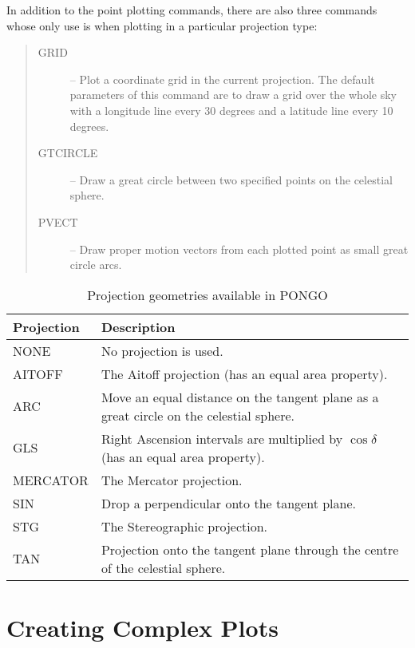 \documentclass[twoside,11pt]{article}
\newcommand{\htmlref}[2]{#1}
\renewcommand{\_}{\texttt{\symbol{95}}}
\newcommand{\iref} [1]{\htmlref{#1}{#1}}
\begin{document}
In addition to the point plotting commands, there are also three commands whose
only use is when plotting in a particular projection type:

\begin {quote}
\begin{description}
\item [\iref{GRID}] -- Plot a coordinate grid in the current projection.
                       The default parameters of this command are to draw a
                       grid over the whole sky with a longitude line every 30
                       degrees and a latitude line every 10 degrees.
\item [\iref{GT\_CIRCLE}] -- Draw a great circle between two specified points
                             on the celestial sphere.
\item [\iref{PVECT}] -- Draw proper motion vectors from each plotted point as
                        small great circle arcs.
\end{description}
\end {quote}

\begin{table}[t]
\centering
\begin{tabular}{|l|p{}|}
\hline 
Projection & Description \\
\hline
NONE     & No projection is used. \\
AITOFF   & The Aitoff projection (has an equal area property). \\
ARC      & Move an equal distance on the tangent plane as a great circle on the
celestial sphere. \\
GLS      & Right Ascension intervals are multiplied by $\cos\delta$ (has an
equal area property). \\
MERCATOR & The Mercator projection. \\
SIN      & Drop a perpendicular onto the tangent plane. \\
STG      & The Stereographic projection. \\
TAN      & Projection onto the tangent plane through the centre of the
celestial sphere. \\
\hline
\end{tabular}
\caption{Projection geometries available in PONGO} \label{proj_tab}
\end{table}


\section{Creating Complex Plots}
\end{document}
